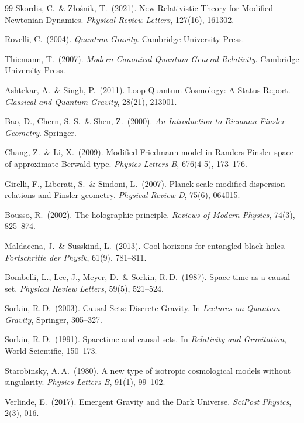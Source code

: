 \documentclass[11pt,a4paper]{article}
\begin{document}
\begin{thebibliography}{99}
Skordis, C.\ \& Z{\l}o\'snik, T.\ (2021).
New Relativistic Theory for Modified Newtonian Dynamics.
\textit{Physical Review Letters}, 127(16), 161302.

Rovelli, C.\ (2004).
\textit{Quantum Gravity}. Cambridge University Press.

Thiemann, T.\ (2007).
\textit{Modern Canonical Quantum General Relativity}. Cambridge University Press.

Ashtekar, A.\ \& Singh, P.\ (2011).
Loop Quantum Cosmology: A Status Report.
\textit{Classical and Quantum Gravity}, 28(21), 213001.

Bao, D., Chern, S.-S.\ \& Shen, Z.\ (2000).
\textit{An Introduction to Riemann-Finsler Geometry}. Springer.

Chang, Z.\ \& Li, X.\ (2009).
Modified Friedmann model in Randers-Finsler space of approximate Berwald type.
\textit{Physics Letters B}, 676(4-5), 173--176.

Girelli, F., Liberati, S.\ \& Sindoni, L.\ (2007).
Planck-scale modified dispersion relations and Finsler geometry.
\textit{Physical Review D}, 75(6), 064015.

Bousso, R.\ (2002).
The holographic principle.
\textit{Reviews of Modern Physics}, 74(3), 825--874.

Maldacena, J.\ \& Susskind, L.\ (2013).
Cool horizons for entangled black holes.
\textit{Fortschritte der Physik}, 61(9), 781--811.

Bombelli, L., Lee, J., Meyer, D.\ \& Sorkin, R.\,D.\ (1987).
Space-time as a causal set.
\textit{Physical Review Letters}, 59(5), 521--524.

Sorkin, R.\,D.\ (2003).
Causal Sets: Discrete Gravity.
In \textit{Lectures on Quantum Gravity}, Springer, 305--327.

Sorkin, R.\,D.\ (1991).
Spacetime and causal sets.
In \textit{Relativity and Gravitation}, World Scientific, 150--173.

Starobinsky, A.\,A.\ (1980).
A new type of isotropic cosmological models without singularity.
\textit{Physics Letters B}, 91(1), 99--102.

Verlinde, E.\ (2017).
Emergent Gravity and the Dark Universe.
\textit{SciPost Physics}, 2(3), 016.


\end{thebibliography}
\end{document}
